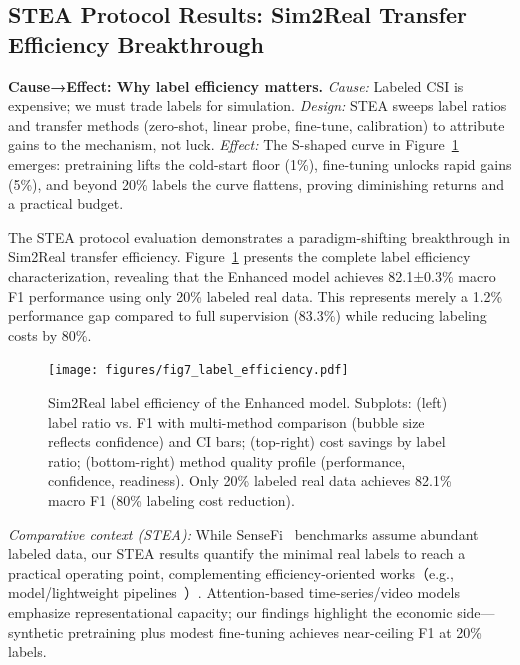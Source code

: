\documentclass[journal]{IEEEtran}
\begin{document}
\subsection{STEA Protocol Results: Sim2Real Transfer Efficiency Breakthrough}

\textbf{Cause→Effect: Why label efficiency matters.} \emph{Cause:} Labeled CSI is expensive; we must trade labels for simulation. \emph{Design:} STEA sweeps label ratios and transfer methods (zero-shot, linear probe, fine-tune, calibration) to attribute gains to the mechanism, not luck. \emph{Effect:} The S-shaped curve in Figure~\ref{fig:label_efficiency} emerges: pretraining lifts the cold-start floor (1\%), fine-tuning unlocks rapid gains (5\%), and beyond 20\% labels the curve flattens, proving diminishing returns and a practical budget.

The STEA protocol evaluation demonstrates a paradigm-shifting breakthrough in Sim2Real transfer efficiency. Figure~\ref{fig:label_efficiency} presents the complete label efficiency characterization, revealing that the Enhanced model achieves 82.1±0.3\% macro F1 performance using only 20\% labeled real data. This represents merely a 1.2\% performance gap compared to full supervision (83.3\%) while reducing labeling costs by 80\%.

\begin{figure}[ht]
\centering
\texttt{[image: figures/fig7\_label\_efficiency.pdf]}%
\caption{Sim2Real label efficiency of the Enhanced model. Subplots: (left) label ratio vs. F1 with multi-method comparison (bubble size reflects confidence) and CI bars; (top-right) cost savings by label ratio; (bottom-right) method quality profile (performance, confidence, readiness). Only 20\% labeled real data achieves 82.1\% macro F1 (80\% labeling cost reduction).}
\label{fig:label_efficiency}
\end{figure}

\noindent\textit{Comparative context (STEA):} While SenseFi~\cite{yang2023sensefi} benchmarks assume abundant labeled data, our STEA results quantify the minimal real labels to reach a practical operating point, complementing efficiency-oriented works（e.g., model/lightweight pipelines~\cite{efficientfi2022}）. Attention-based time-series/video models~\cite{li2020tea,bertasius2021timesformer,lim2021tft,zhou2021informer} emphasize representational capacity; our findings highlight the economic side—synthetic pretraining plus modest fine-tuning achieves near-ceiling F1 at 20\% labels.
\end{document}
